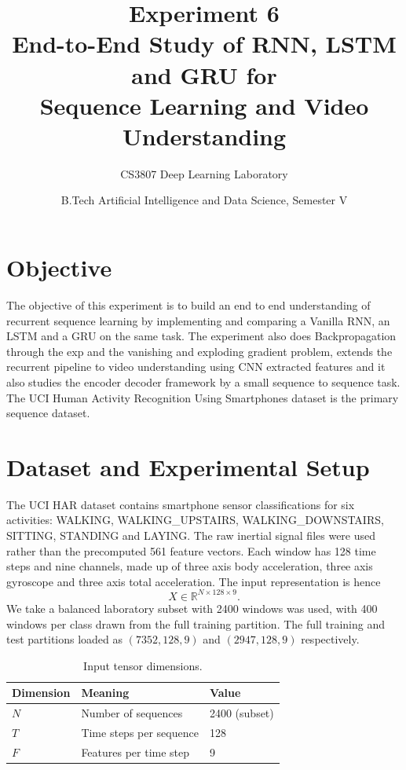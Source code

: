 \documentclass[12pt]{article}
\title{\vspace{-1cm}\textbf{Experiment 6\\ End-to-End Study of RNN, LSTM and GRU for\\ Sequence Learning and Video Understanding}}
\author{CS3807 Deep Learning Laboratory}
\date{B.Tech Artificial Intelligence and Data Science, Semester V}
\begin{document}
\maketitle
\thispagestyle{fancy}

\section{Objective}
The objective of this experiment is to build an end to end understanding of recurrent sequence learning by implementing and comparing a Vanilla RNN, an LSTM and a GRU on the same task. The experiment also does Backpropagation through the exp and the vanishing and exploding gradient problem, extends the recurrent pipeline to video understanding using CNN extracted features and it also studies the encoder decoder framework by a small sequence to sequence task. The UCI Human Activity Recognition Using Smartphones dataset is   the primary sequence dataset.

\section{Dataset and Experimental Setup}
The UCI HAR dataset  contains smartphone sensor  classifications  for six activities: WALKING, WALKING\_UPSTAIRS, WALKING\_DOWNSTAIRS, SITTING, STANDING and LAYING. The  raw inertial signal files were used rather than the precomputed 561 feature vectors. Each window has 128 time steps and nine channels, made up of three axis body acceleration,  three axis gyroscope and three axis total  acceleration. The input representation is hence 
\[
X \in \mathbb{R}^{N \times 128 \times 9}.
\]
We take a  balanced laboratory subset with 2400 windows was used, with 400 windows per class drawn from the full training partition. The full training and test partitions loaded as $(7352, 128, 9)$ and $(2947, 128, 9)$ respectively.

\begin{table}[H]
\centering
\caption{Input tensor dimensions.}
\begin{tabular}{@{}lll@{}}
\toprule
Dimension & Meaning & Value \\
\midrule
$N$ & Number of sequences & 2400 (subset) \\
$T$ & Time steps per sequence & 128 \\
$F$ & Features per time step & 9 \\
\bottomrule
\end{tabular}
\end{table}
\end{document}
